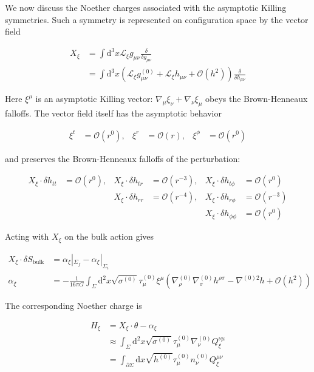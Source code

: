 We now discuss the Noether charges associated with the asymptotic Killing symmetries. Such a symmetry is represented on configuration space by the vector field

\begin{align}
X_{\xi} & =\int \mathrm{d}^{3}x\mathcal{L}_{\xi}g_{\mu \nu} \frac{\delta}{\delta g_{\mu \nu}} \\
 & =\int \mathrm{d}^{3}x\left(\mathcal{L}_{\xi}g^{(0)}_{\mu \nu} +\mathcal{L}_{\xi}h_{\mu \nu}+\mathcal{O}(h^{2})\right) \frac{\delta}{\delta h_{\mu \nu}}
\end{align}

Here \(\xi ^{\mu}\) is an asymptotic Killing vector: \(\nabla _{\mu}\xi _{\nu}+\nabla _{\nu}\xi _{\mu}\) obeys the Brown-Henneaux falloffs. The vector field itself has the asymptotic behavior

\begin{align}
\xi ^{t} & =\mathcal{O}(r^{0}), & \xi ^{r} & =\mathcal{O}(r), & \xi ^{\phi} & =\mathcal{O}(r^{0})
\end{align}

and preserves the Brown-Henneaux falloffs of the perturbation:

\begin{align}
X_{\xi}\cdot \delta h_{tt} & =\mathcal{O}(r^{0}), & X_{\xi}\cdot \delta h_{tr} & =\mathcal{O}(r^{-3}), & X_{\xi}\cdot \delta h_{t\phi} & =\mathcal{O}(r^{0}) \\
 & & X_{\xi}\cdot \delta h_{rr} & =\mathcal{O}(r^{-4}), & X_{\xi}\cdot \delta h_{r\phi} & =\mathcal{O}(r^{-3}) \\
 &  &  &  & X_{\xi}\cdot \delta h_{\phi \phi} & =\mathcal{O}(r^{0})
\end{align}

Acting with \(X_{\xi}\) on the bulk action gives

\begin{align}
X_{\xi}\cdot \delta S_{\text{bulk}} & =\alpha _{\xi}|_{\Sigma _{f}}-\alpha _{\xi}|_{\Sigma _{i}} \\
\alpha _{\xi} & =-\frac{1}{16\pi G}\int _{\Sigma}\mathrm{d}^{2}x\sqrt{ \sigma ^{(0)} }\tau ^{(0)}_{\mu}\xi ^{\mu}\left(\nabla ^{(0)}_{\rho}\nabla ^{(0)}_{\sigma}h^{\rho \sigma}-\nabla ^{(0)2}h+\mathcal{O}(h^{2})\right)
\end{align}

The corresponding Noether charge is

\begin{align}
H_{\xi} & =X_{\xi}\cdot \theta-\alpha _{\xi} \\
 & \approx \int _{\Sigma}\mathrm{d}^{2}x\sqrt{ \sigma ^{(0)} }\tau ^{(0)} _{\mu}\nabla ^{(0)} _{\nu}Q_{\xi}^{\nu \mu} \\
 & =\int _{\partial \Sigma}\mathrm{d}x\sqrt{ h^{(0)} }\tau _{\mu}^{(0)}n^{(0)}_{\nu}Q_{\xi}^{\mu \nu}
\end{align}

